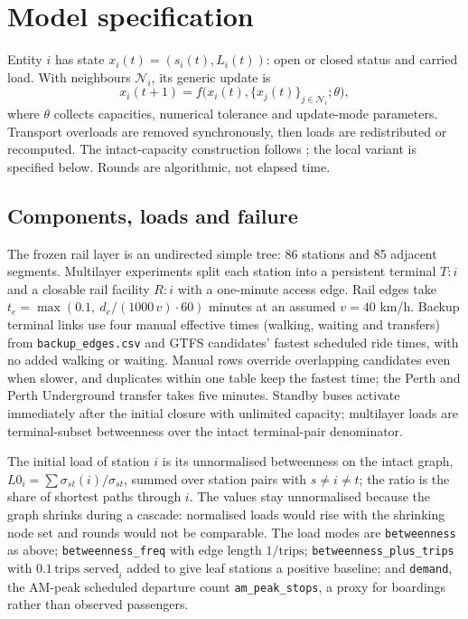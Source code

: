 
\section{Model specification}
\label{sec:model}

Entity $i$ has state $x_i(t)=(s_i(t),L_i(t))$: open or closed status and carried
load. With neighbours $\mathcal{N}_i$, its generic update is
\begin{equation}
  x_i(t+1) = f\bigl(x_i(t), \{x_j(t)\}_{j \in \mathcal{N}_i}; \theta\bigr),
  \label{eq:update}
\end{equation}
where $\theta$ collects capacities, numerical tolerance and update-mode
parameters. Transport overloads are removed synchronously, then loads are
redistributed or recomputed. The intact-capacity construction follows
\citet{motter2002cascade}; the local variant is specified below. Rounds are
algorithmic, not elapsed time.

\subsection{Components, loads and failure}
The frozen rail layer is an undirected simple tree: 86 stations and 85 adjacent
segments. Multilayer experiments split each station into a
persistent terminal $T{:}i$ and a closable rail facility $R{:}i$ with a
one-minute access edge. Rail edges take
$t_e = \max(0.1,\ d_e/(1000\,v)\cdot 60)$ minutes at an assumed $v = 40$ km/h.
Backup terminal links use four manual effective times (walking, waiting and
transfers) from \texttt{backup\_edges.csv} and GTFS candidates' fastest scheduled
ride times, with no added walking or waiting. Manual rows override overlapping
candidates even when slower, and duplicates within one table keep the fastest
time; the Perth and Perth Underground transfer takes five minutes. Standby
buses activate immediately after the initial closure with unlimited capacity;
multilayer loads are terminal-subset betweenness over the intact terminal-pair
denominator.

The initial load of station $i$ is its unnormalised betweenness on the intact
graph, $L0_i = \sum \sigma_{st}(i) / \sigma_{st}$, summed over station pairs
with $s \neq i \neq t$; the ratio is the share of shortest paths through $i$. The values stay unnormalised because the graph shrinks
during a cascade: normalised loads would rise with the shrinking node set and
rounds would not be comparable. The load modes are \texttt{betweenness} as
above; \texttt{betweenness\_freq} with edge length $1/\text{trips}$;
\texttt{betweenness\_plus\_trips} with $0.1\,\text{trips served}_i$ added to
give leaf stations a positive baseline; and \texttt{demand}, the AM-peak
scheduled departure count \texttt{am\_peak\_stops}, a proxy for boardings
rather than observed passengers.

